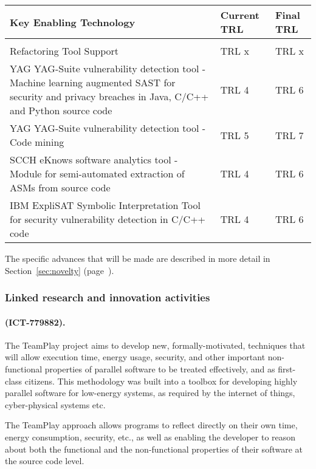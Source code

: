 \documentclass[a4paper,11pt]{article}
\begin{document}
\begin{center}
  \begin{tabular}{|p{4.9in}|l|l|}
    \hline
    \textbf{Key Enabling Technology} & \textbf{Current TRL} & \textbf{Final TRL} \\
    \hline
     &  & \\
    \hline Refactoring Tool Support & TRL x & TRL x \\  
    \hline YAG YAG-Suite vulnerability detection tool - Machine learning augmented SAST for security and privacy breaches in Java, C/C++ and Python source code & TRL 4 & TRL 6 \\  
    \hline YAG YAG-Suite vulnerability detection tool - Code mining & TRL 5 & TRL 7 \\  
    \hline SCCH eKnows software analytics tool - Module for semi-automated extraction of ASMs from source code & TRL 4 & TRL 6 \\
    \hline IBM ExpliSAT Symbolic Interpretation Tool for security vulnerability detection in C/C++ code & TRL 4 & TRL 6 \\
    \hline
  \end{tabular}
\end{center}

\noindent
The specific advances that will be made are described in more detail in Section~\ref{sec:novelty} (page~\pageref{sec:novelty}).


\subsubsection{Linked research and innovation activities}
\label{projects}



\begin{mdframed}[backgroundcolor=blue!5]
\paragraph{\teamplay (ICT-779882).}
The TeamPlay project aims to develop new, formally-motivated, techniques that will allow execution time, energy usage, security, and other important non-functional properties of parallel software to be treated effectively, and as first-class citizens. This methodology was built into a toolbox for developing highly parallel software for low-energy systems, as required by the internet of things, cyber-physical systems etc.

The TeamPlay approach allows programs to reflect directly on their own time, energy consumption, security, etc., as well as enabling the developer to reason about both the functional and the non-functional properties of their software at the source code level.
\end{mdframed}
\end{document}
